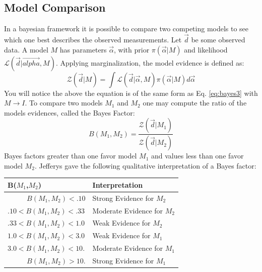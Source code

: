 \documentclass[12pt]{article}
\numberwithin{equation}{section}
\begin{document}
\subsection{Model Comparison}
In a bayesian framework it is possible to compare two competing models to see which one best describes the observed measurements. Let $\vec{d}$ be some observed data. A model $M$ has parameters $\vec{\alpha}$, with prior $\pi(\vec{\alpha}|M)$ and likelihood $\mathcal{L}(\vec{d}|\vec{alpha},M)$. Applying marginalization, the model evidence is defined as:
\begin{equation} \label{eq:evidence}
	\mathcal{Z}(\vec{d}|M) = \int \mathcal{L}(\vec{d}|\vec{\alpha},M)\pi(\vec{\alpha}|M)d\vec{\alpha}
\end{equation}
You will notice the above the equation is of the same form as Eq. \ref{eq:bayes3} with $M \rightarrow I$. To compare two models $M_1$ and $M_2$ one may compute the ratio of the models evidences, called the Bayes Factor\cite{von2011bayesian}:
\begin{equation} \label{eq:bayesfactor}
	B(M_1,M_2) = \frac{\mathcal{Z}(\vec{d}|M_1)}{\mathcal{Z}(\vec{d}|M_2)} 
\end{equation}
Bayes factors greater than one favor model $M_1$ and values less than one favor model $M_2$. Jefferys \cite{jeffreys1998theory} gave the following qualitative interpretation of a Bayes factor:
\begin{center}
	\begin{tabular}{l|l}
		\bf{B($M_1$,$M_2$)} & \bf{Interpretation} \\ 
		\hline
		${\qquad \;\;\, B(M_1,M_2) < .10}$ & Strong Evidence for $M_2$ \\
		${.10 < B(M_1,M_2) < .33}$ & Moderate Evidence for $M_2$ \\
		${.33 < B(M_1,M_2) < 1.0}$ & Weak Evidence for $M_2$ \\
		${1.0 < B(M_1,M_2) < 3.0}$ & Weak Evidence for $M_1$ \\
		${3.0 < B(M_1,M_2) < 10.}$ & Moderate Evidence for $M_1$ \\
		${\qquad \;\;\, B(M_1,M_2) > 10.}$ & Strong Evidence for $M_1$ \\
	\end{tabular}
	\label{tab:bayesfactor}
\end{center}
\end{document}
